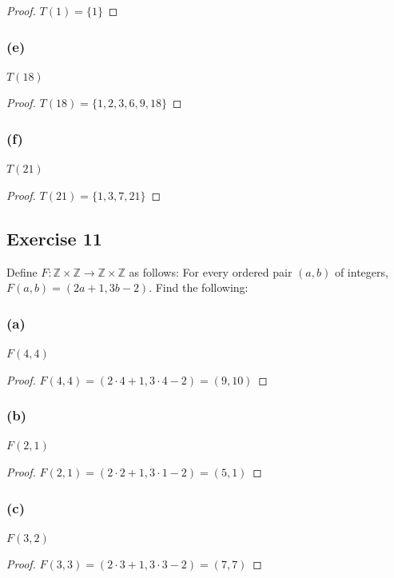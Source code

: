 \documentclass[14pt]{extarticle}
\newcommand{\Z}{\mathbb{Z}}
\begin{document}
\begin{proof}
\(T(1) = \{1\}\)
\end{proof}

\subsubsection{(e)}
$T(18)$

\begin{proof}
\(T(18) = \{1, 2, 3, 6, 9, 18\}\)
\end{proof}

\subsubsection{(f)}
$T(21)$

\begin{proof}
\(T(21) = \{1, 3, 7, 21\}\)
\end{proof}

\subsection{Exercise 11}
Define \(F: \Z \times \Z \to \Z \times \Z\) as follows: For every ordered pair \((a,b)\) of integers, \(F(a,b) = (2a+1, 
3b-2)\). Find the following:

\subsubsection{(a)}
$F(4,4)$

\begin{proof}
\(F(4, 4) = (2 \cdot 4 + 1, 3 \cdot 4 - 2) = (9, 10)\)
\end{proof}

\subsubsection{(b)}
$F(2,1)$

\begin{proof}
\(F(2, 1) = (2 \cdot 2 + 1, 3 \cdot 1 - 2) = (5, 1)\)
\end{proof}

\subsubsection{(c)}
$F(3,2)$

\begin{proof}
\(F(3, 3) = (2 \cdot 3 + 1, 3 \cdot 3 - 2) = (7, 7)\)
\end{proof}
\end{document}
